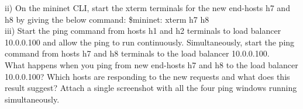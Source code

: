 \documentclass[a4paper]{article}
\begin{document}
ii) On the mininet CLI, start the xterm terminals for the new end-hosts h7 and h8 by giving the below command: \$mininet: xterm h7 h8 \\

iii) Start the ping command from hosts h1 and h2 terminals to load balancer 10.0.0.100 and allow the ping to run continuously. Simultaneously, start the ping command from hosts h7 and h8 terminals to the load balancer 10.0.0.100. \\

What happens when you ping from new end-hosts h7 and h8 to the load balancer 10.0.0.100? Which hosts are responding to the new requests and what does this result suggest? Attach a single screenshot with all the four ping windows running simultaneously.
\end{document}
